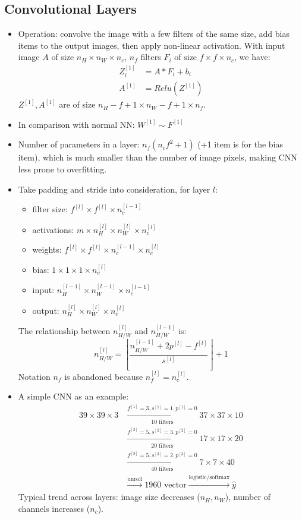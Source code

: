 \subsection{Convolutional Layers}
\begin{itemize}
  \item Operation: convolve the image with a few filters of the same size, add bias items to the output images, then apply non-linear activation. With input image $A$ of size $n_H\times n_W\times n_c$, $n_f$ filters $F_i$ of size $f\times f\times n_c$, we have:
  \begin{align*}
    Z^{[1]}_i&=A*F_i + b_i\\
    A^{[1]}&=Relu\left(Z^{[1]}\right)
  \end{align*}
  $Z^{[1]}, A^{[1]}$ are of size $n_H-f+1\times n_W-f+1\times n_f$.
  \item In comparison with normal NN: $W^{[1]}\sim F^{[1]}$
  \item Number of parameters in a layer: $n_f\left(n_cf^2 + 1\right)$ (+1 item is for the bias item), which is much smaller than the number of image pixels, making CNN less prone to overfitting.
  \item Take padding and stride into consideration, for layer $l$: 
  \begin{itemize}
      \item filter size: $f^{[l]}\times f^{[l]}\times n_c^{[l-1]}$
      \item activations: $m\times n_H^{[l]}\times n_W^{[l]}\times n_c^{[l]}$
      \item weights: $f^{[l]}\times f^{[l]}\times n_c^{[l-1]}\times n_c^{[l]}$
      \item bias: $1\times 1\times 1\times n_c^{[l]}$
      \item input: $n_H^{[l-1]}\times n_W^{[l-1]}\times n_c^{[l-1]}$
      \item output: $n_H^{[l]}\times n_W^{[l]}\times n_c^{[l]}$
  \end{itemize}
  The relationship between $n^{[l]}_{H/W}$ and $n^{[l-1]}_{H/W}$ is:
  \[n^{[l]}_{H/W}=\left\lfloor\frac{n^{[l-1]}_{H/W}+2p^{[l]}-f^{[l]}}{s^{[l]}}\right\rfloor+1\]
  Notation $n_f$ is abandoned because $n_f^{[l]}=n_c^{[l]}$.
  \item A simple CNN as an example:
  \begin{align*}
    39\times 39\times 3&\xrightarrow[10\text{ filters}]{f^{[1]}=3,s^{[1]}=1,p^{[1]}=0}37\times 37\times 10\\
    &\xrightarrow[20\text{ filters}]{f^{[2]}=5,s^{[2]}=3,p^{[2]}=0}17\times 17\times 20\\
    &\xrightarrow[40\text{ filters}]{f^{[3]}=5,s^{[3]}=2,p^{[3]}=0}7\times 7\times 40\\
    &\xrightarrow{\text{unroll}}1960\text{ vector}\xrightarrow{\text{logistic/softmax}}\hat{y}
  \end{align*}
  Typical trend across layers: image size decreases ($n_H, n_W$), number of channels increases ($n_c$).
\end{itemize}
